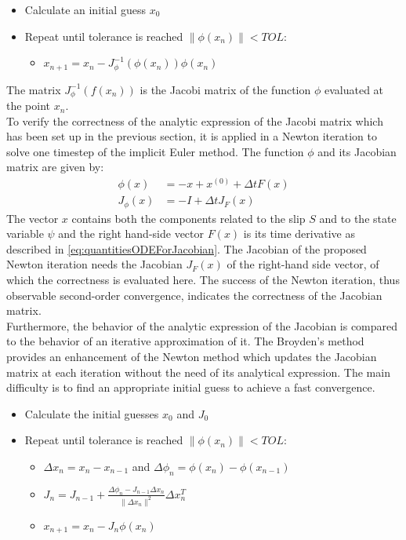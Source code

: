 \documentclass{report}
\begin{document}
\begin{itemize}
	\item Calculate an initial guess $x_0$
	\item Repeat until tolerance is reached $\|\phi(x_n)\| < TOL$: 
	\begin{itemize}
		\item $x_{n+1} = x_n - J_\phi^{-1}(\phi(x_n)) \phi(x_n)$
	\end{itemize} 
\end{itemize}

The matrix $J_\phi^{-1}(f(x_n))$ is the Jacobi matrix of the function $\phi$ evaluated at the point $x_n$. \\
To verify the correctness of the analytic expression of the Jacobi matrix which has been set up in the previous section, it is applied in a Newton iteration to solve one timestep of the implicit Euler method. The function $\phi$ and its Jacobian matrix are given by: 
\begin{align}
	\phi(x) &= -x + x^{(0)} + \Delta t F(x) \\
	J_\phi(x) &= -I + \Delta t J_F(x)
\end{align}
The vector $x$ contains both the components related to the slip $S$ and to the state variable $\psi$ and the right hand-side vector $F(x)$ is its time derivative as described in \autoref{eq:quantitiesODEForJacobian}. The Jacobian of the proposed Newton iteration needs the Jacobian $J_F(x)$ of the right-hand side vector, of which the correctness is evaluated here. The success of the Newton iteration, thus observable second-order convergence, indicates the correctness of the Jacobian matrix. \\
Furthermore, the behavior of the analytic expression of the Jacobian is compared to the behavior of an iterative approximation of it. The Broyden's method \cite{BroydenIteration} provides an enhancement of the Newton method which updates the Jacobian matrix at each iteration without the need of its analytical expression. The main difficulty is to find an appropriate initial guess to achieve a fast convergence. 

\begin{itemize}
	\item Calculate the initial guesses $x_0$ and $J_0$
	\item Repeat until tolerance is reached $\|\phi(x_n)\| < TOL$: 
	\begin{itemize}
		\item $\Delta x_n = x_n - x_{n-1}$ and $\Delta \phi_n = \phi(x_n) - \phi(x_{n-1})$ 
		\item $J_n = J_{n-1} + \frac{\Delta \phi_n - J_{n-1}\Delta x_n}{\|\Delta x_n\|^2} \Delta x_n^T$
		\item $x_{n+1} = x_n - J_n \phi(x_n)$
	\end{itemize} 
\end{itemize}
\end{document}
